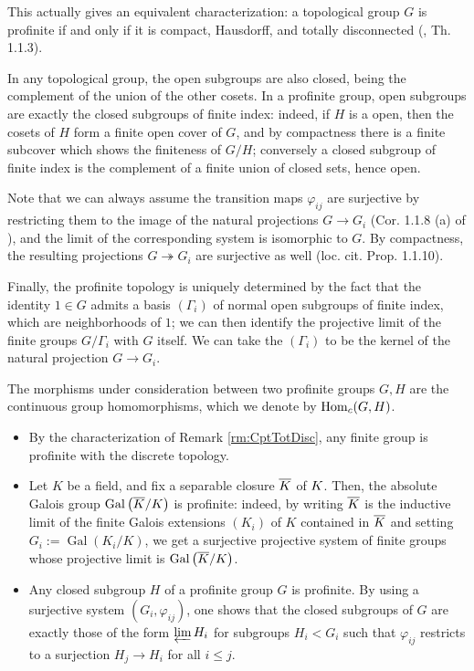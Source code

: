\documentclass[a4paper, oneside]{memoir}
\begin{document}
\begin{remark}\label{rm:CptTotDisc}
	This actually gives an equivalent characterization: a topological group $G$ is profinite if and only if it is compact, Hausdorff, and totally disconnected (\cite{Neukirch}, Th. 1.1.3).
\end{remark}

In any topological group, the open subgroups are also closed, being the complement of the union of the other cosets. In a profinite group, open subgroups are exactly the closed subgroups of finite index: indeed, if $H$ is a open, then the cosets of $H$ form a finite open cover of $G$, and by compactness there is a finite subcover which shows the finiteness of $G/H$; conversely a closed subgroup of finite index is the complement of a finite union of closed sets, hence open.

Note that we can always assume the transition maps $\varphi_{ij}$ are surjective by restricting them to the image of the natural projections $G \to G_i$ (Cor. 1.1.8 (a) of \cite{RibesZalesskii}), and the limit of the corresponding system is isomorphic to $G$. By compactness, the resulting projections $G\twoheadrightarrow G_i$ are surjective as well (loc. cit. Prop. 1.1.10).

Finally, the profinite topology is uniquely determined by the fact that the identity $1\in G$ admits a basis $(\Gamma_i)$ of normal open subgroups of finite index, which are neighborhoods of $1$; we can then identify the projective limit of the finite groups $G / \Gamma_i$ with $G$ itself. We can take the $(\Gamma_i)$ to be the kernel of the natural projection $G\to G_i$.

The morphisms under consideration between two profinite groups $G,H$ are the continuous group homomorphisms, which we denote by $\operatorname{Hom}_{c}(G,H)$.

\begin{example}
	\begin{itemize}
		\item By the characterization of Remark \ref{rm:CptTotDisc}, any finite group is profinite with the discrete topology.
		\item Let $K$ be a field, and fix a separable closure $\overline{K}$ of $K$. Then, the absolute Galois group $\operatorname{Gal}\left( \overline{K}/K \right)$ is profinite: indeed, by writing $\overline{K}$ is the inductive limit of the finite Galois extensions $(K_i)$ of $K$ contained in $\overline{K}$ and setting $G_i:=\operatorname{Gal}{(K_i/K)}$, we get a surjective projective system of finite groups whose projective limit is $\operatorname{Gal}\left( \overline{K}/K \right)$.
		\item Any closed subgroup $H$ of a profinite group $G$ is profinite. By using a surjective system $(G_i,\varphi_{ij})$, one shows that the closed subgroups of $G$ are exactly those of the form $\varprojlim H_i$ for subgroups $H_i<G_i$ such that $\varphi_{ij}$ restricts to a surjection $H_j\to H_i$ for all $i\leq j$.
	\end{itemize}
\end{example}
\end{document}
